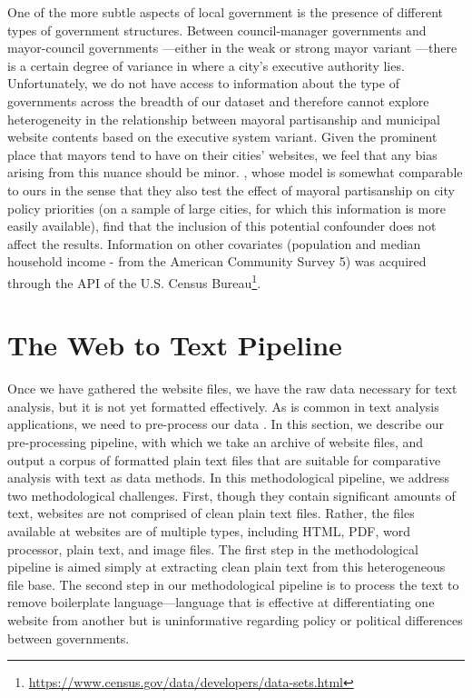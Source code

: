\documentclass[11pt]{article}
\begin{document}
 

One of the more subtle aspects of local government is the presence of different types of government structures. Between council-manager governments and mayor-council governments \citep{morgan1992policy}---either in the weak or strong mayor variant \citep{desantis2002city}---there is a certain degree of variance in where a city's executive authority lies. Unfortunately, we do not have access to information about the type of governments across the breadth of our dataset and therefore cannot explore heterogeneity in the relationship between mayoral partisanship and municipal website contents based on the executive system variant. Given the prominent place that mayors tend to have on their cities' websites, we feel that any bias arising from this nuance should be minor. \citep{gerber2011mayors}, whose model is somewhat comparable to ours in the sense that they also test the effect of mayoral partisanship on city policy priorities (on a sample of large cities, for which this information is more easily available), find that the inclusion of this potential confounder does not affect the results. Information on other covariates (population and median household income - from the American Community Survey 5) was acquired through the API of the U.S. Census Bureau\footnote{\url{https://www.census.gov/data/developers/data-sets.html}}.


\section{The Web to Text Pipeline}

Once we have gathered the website files, we have the raw data necessary for text analysis, but it is not yet formatted effectively. As is common in text analysis applications, we need to pre-process our data \citep{denny2018text}. In this section, we describe our pre-processing pipeline, with which we take an archive of website files, and output a corpus of formatted plain text files that are suitable for comparative analysis with text as data methods. In this methodological pipeline, we address two methodological challenges. First, though they contain significant amounts of text, websites are not comprised of clean plain text files. Rather, the files available at websites are of multiple types, including HTML, PDF, word processor, plain text, and image files. The first step in the methodological pipeline is aimed simply at extracting clean plain text from this heterogeneous file base. The second step in our methodological pipeline is to process the text to remove boilerplate language---language that is effective at differentiating one website from another but is uninformative regarding policy or political differences between governments. 
\end{document}

